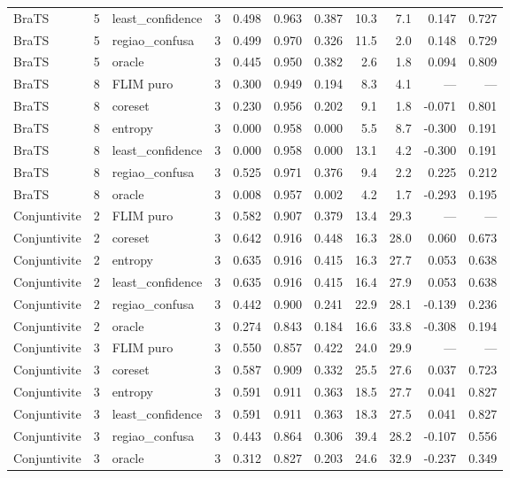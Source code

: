 \begin{tabular}{lllrrrrrrrr}
BraTS & 5 & least\_confidence & 3 & 0.498 & 0.963 & 0.387 & 10.3 & 7.1 & 0.147 & 0.727 \\
BraTS & 5 & regiao\_confusa & 3 & 0.499 & 0.970 & 0.326 & 11.5 & 2.0 & 0.148 & 0.729 \\
BraTS & 5 & oracle & 3 & 0.445 & 0.950 & 0.382 & 2.6 & 1.8 & 0.094 & 0.809 \\
BraTS & 8 & FLIM puro & 3 & 0.300 & 0.949 & 0.194 & 8.3 & 4.1 & --- & --- \\
BraTS & 8 & coreset & 3 & 0.230 & 0.956 & 0.202 & 9.1 & 1.8 & -0.071 & 0.801 \\
BraTS & 8 & entropy & 3 & 0.000 & 0.958 & 0.000 & 5.5 & 8.7 & -0.300 & 0.191 \\
BraTS & 8 & least\_confidence & 3 & 0.000 & 0.958 & 0.000 & 13.1 & 4.2 & -0.300 & 0.191 \\
BraTS & 8 & regiao\_confusa & 3 & 0.525 & 0.971 & 0.376 & 9.4 & 2.2 & 0.225 & 0.212 \\
BraTS & 8 & oracle & 3 & 0.008 & 0.957 & 0.002 & 4.2 & 1.7 & -0.293 & 0.195 \\
Conjuntivite & 2 & FLIM puro & 3 & 0.582 & 0.907 & 0.379 & 13.4 & 29.3 & --- & --- \\
Conjuntivite & 2 & coreset & 3 & 0.642 & 0.916 & 0.448 & 16.3 & 28.0 & 0.060 & 0.673 \\
Conjuntivite & 2 & entropy & 3 & 0.635 & 0.916 & 0.415 & 16.3 & 27.7 & 0.053 & 0.638 \\
Conjuntivite & 2 & least\_confidence & 3 & 0.635 & 0.916 & 0.415 & 16.4 & 27.9 & 0.053 & 0.638 \\
Conjuntivite & 2 & regiao\_confusa & 3 & 0.442 & 0.900 & 0.241 & 22.9 & 28.1 & -0.139 & 0.236 \\
Conjuntivite & 2 & oracle & 3 & 0.274 & 0.843 & 0.184 & 16.6 & 33.8 & -0.308 & 0.194 \\
Conjuntivite & 3 & FLIM puro & 3 & 0.550 & 0.857 & 0.422 & 24.0 & 29.9 & --- & --- \\
Conjuntivite & 3 & coreset & 3 & 0.587 & 0.909 & 0.332 & 25.5 & 27.6 & 0.037 & 0.723 \\
Conjuntivite & 3 & entropy & 3 & 0.591 & 0.911 & 0.363 & 18.5 & 27.7 & 0.041 & 0.827 \\
Conjuntivite & 3 & least\_confidence & 3 & 0.591 & 0.911 & 0.363 & 18.3 & 27.5 & 0.041 & 0.827 \\
Conjuntivite & 3 & regiao\_confusa & 3 & 0.443 & 0.864 & 0.306 & 39.4 & 28.2 & -0.107 & 0.556 \\
Conjuntivite & 3 & oracle & 3 & 0.312 & 0.827 & 0.203 & 24.6 & 32.9 & -0.237 & 0.349 \\

\end{tabular}
